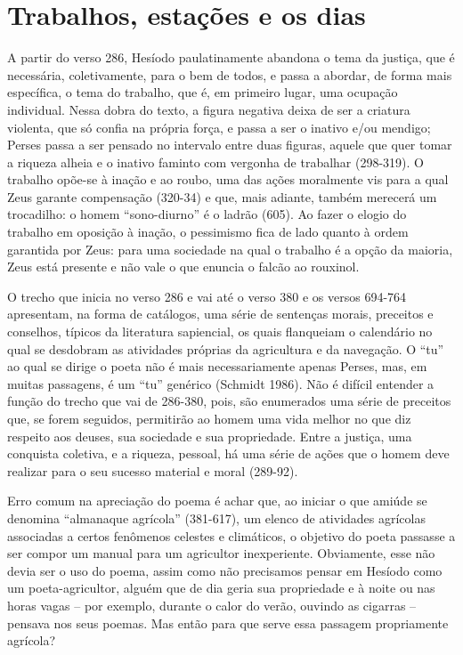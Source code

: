 \section{Trabalhos, estações e os dias}

A partir do verso 286, Hesíodo paulatinamente abandona o tema da
justiça, que é necessária, coletivamente, para o bem de todos, e passa a
abordar, de forma mais específica, o tema do trabalho, que é, em
primeiro lugar, uma ocupação individual. Nessa dobra do texto, a figura
negativa deixa de ser a criatura violenta, que só confia na própria
força, e passa a ser o inativo e/ou mendigo; Perses passa a ser pensado
no intervalo entre duas figuras, aquele que quer tomar a riqueza alheia
e o inativo faminto com vergonha de trabalhar (298-319). O trabalho
opõe-se à inação e ao roubo, uma das ações moralmente vis para a qual
Zeus garante compensação (320-34) e que, mais adiante, também merecerá
um trocadilho: o homem ``sono-diurno'' é o ladrão (605). Ao fazer o
elogio do trabalho em oposição à inação, o pessimismo fica de lado
quanto à ordem garantida por Zeus: para uma sociedade na qual o trabalho
é a opção da maioria, Zeus está presente e não vale o que enuncia o
falcão ao rouxinol.

O trecho que inicia no verso 286 e vai até o verso 380 e os versos
694-764 apresentam, na forma de catálogos, uma série de sentenças
morais, preceitos e conselhos, típicos da literatura sapiencial, os
quais flanqueiam o calendário no qual se desdobram as atividades
próprias da agricultura e da navegação. O ``tu'' ao qual se dirige o
poeta não é mais necessariamente apenas Perses, mas, em muitas
passagens, é um ``tu'' genérico (Schmidt 1986). Não é difícil entender a
função do trecho que vai de 286-380, pois, são enumerados uma série de
preceitos que, se forem seguidos, permitirão ao homem uma vida melhor no
que diz respeito aos deuses, sua sociedade e sua propriedade. Entre a
justiça, uma conquista coletiva, e a riqueza, pessoal, há uma série de
ações que o homem deve realizar para o seu sucesso material e moral
(289-92).

Erro comum na apreciação do poema é achar que, ao iniciar o que amiúde
se denomina ``almanaque agrícola'' (381-617), um elenco de atividades
agrícolas associadas a certos fenômenos celestes e climáticos, o
objetivo do poeta passasse a ser compor um manual para um agricultor
inexperiente. Obviamente, esse não devia ser o uso do poema, assim como
não precisamos pensar em Hesíodo como um poeta-agricultor, alguém que de
dia geria sua propriedade e à noite ou nas horas vagas -- por exemplo,
durante o calor do verão, ouvindo as cigarras -- pensava nos seus
poemas. Mas então para que serve essa passagem propriamente agrícola?

